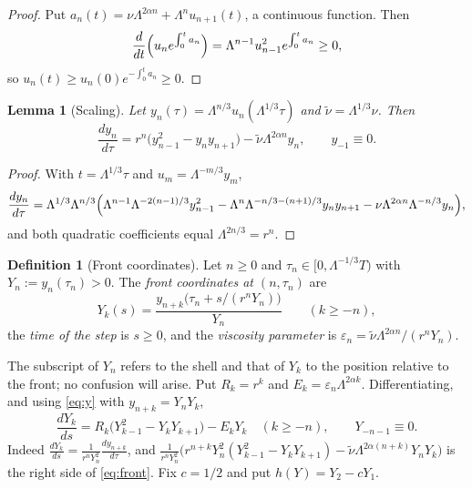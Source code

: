 \documentclass[12pt,reqno]{amsart}
\numberwithin{equation}{section}
\theoremstyle{plain}
\newtheorem{lemma}[theorem]{Lemma}
\theoremstyle{definition}
\newtheorem{definition}[theorem]{Definition}
\theoremstyle{remark}
\newcommand{\eps}{\varepsilon}
\begin{document}
\begin{proof}
Put $a_n(t)=\nu\Lambda^{2\alpha n}+\Lambda^nu_{n+1}(t)$, a continuous function. Then
\[
  \frac{d}{dt}\Bigl(u_ne^{\int_0^ta_n}\Bigr)=\Lambda^{n-1}u_{n-1}^2e^{\int_0^ta_n}\ge0,
\]
so $u_n(t)\ge u_n(0)e^{-\int_0^ta_n}\ge0$.
\end{proof}

\begin{lemma}[Scaling]\label{lem:scaling}
Let $y_n(\tau)=\Lambda^{n/3}u_n(\Lambda^{1/3}\tau)$ and $\tilde\nu=\Lambda^{1/3}\nu$. Then
\begin{equation}\label{eq:y}
  \frac{dy_n}{d\tau}=r^n\bigl(y_{n-1}^2-y_ny_{n+1}\bigr)-\tilde\nu\Lambda^{2\alpha n}y_n,
  \qquad y_{-1}\equiv0.
\end{equation}
\end{lemma}

\begin{proof}
With $t=\Lambda^{1/3}\tau$ and $u_m=\Lambda^{-m/3}y_m$,
\[
\frac{dy_n}{d\tau}=\Lambda^{1/3}\Lambda^{n/3}\Bigl(\Lambda^{n-1}\Lambda^{-2(n-1)/3}y_{n-1}^2
-\Lambda^{n}\Lambda^{-n/3-(n+1)/3}y_ny_{n+1}-\nu\Lambda^{2\alpha n}\Lambda^{-n/3}y_n\Bigr),
\]
and both quadratic coefficients equal $\Lambda^{2n/3}=r^n$.
\end{proof}

\begin{definition}[Front coordinates]\label{def:front}
Let $n\ge0$ and $\tau_n\in[0,\Lambda^{-1/3}T)$ with $Y_n:=y_n(\tau_n)>0$. The
\emph{front coordinates at $(n,\tau_n)$} are
\[
  Y_k(s)=\frac{y_{n+k}\bigl(\tau_n+s/(r^nY_n)\bigr)}{Y_n}\qquad(k\ge-n),
\]
the \emph{time of the step} is $s\ge0$, and the \emph{viscosity parameter} is
$\eps_n=\tilde\nu\Lambda^{2\alpha n}/(r^nY_n)$.
\end{definition}

The subscript of $Y_n$ refers to the shell and that of $Y_k$ to the
position relative to the front; no confusion will arise. Put
$R_k=r^k$ and $E_k=\eps_n\Lambda^{2\alpha k}$. Differentiating, and using
\eqref{eq:y} with $y_{n+k}=Y_nY_k$,
\begin{equation}\label{eq:front}
  \frac{dY_k}{ds}=R_k\bigl(Y_{k-1}^2-Y_kY_{k+1}\bigr)-E_kY_k\quad(k\ge-n),\qquad Y_{-n-1}\equiv0 .
\end{equation}
Indeed $\frac{dY_k}{ds}=\frac{1}{r^nY_n^2}\frac{dy_{n+k}}{d\tau}$, and
$\frac{1}{r^nY_n^2}\bigl(r^{n+k}Y_n^2(Y_{k-1}^2-Y_kY_{k+1})-\tilde\nu\Lambda^{2\alpha(n+k)}Y_nY_k\bigr)$
is the right side of \eqref{eq:front}. Fix $c=1/2$ and put
$h(Y)=Y_2-cY_1$.
\end{document}
